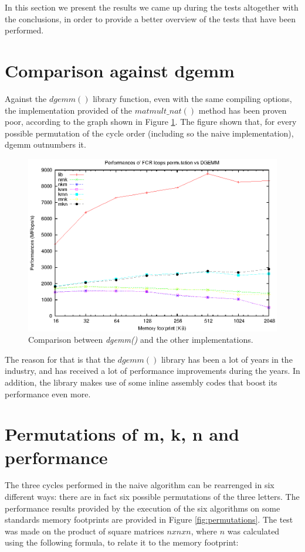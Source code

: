 In this section we present the results we came up during the tests altogether with the conclusions, in order to provide a better overview of the tests that have been performed. 

\section{Comparison against dgemm}

Against the $dgemm()$ library function, even with the same compiling options, the implementation provided of the $matmult\_nat()$ method has been proven poor, according to the graph shown in Figure \ref{fig:natdgemmcomp}. The figure shown that, for every possible permutation of the cycle order (including so the naive implementation), dgemm outnumbers it.

\begin{figure}[here]
\centering
\includegraphics[width=\textwidth]{results/dgemm.eps}
\caption{Comparison between \emph{dgemm()} and the other implementations.}
\label{fig:natdgemmcomp}
\end{figure}

The reason for that is that the $dgemm()$ library has been a lot of years in the industry, and has received a lot of performance improvements during the years. In addition, the library makes use of some inline assembly codes that boost its performance even more.

\section{Permutations of m, k, n and performance}
The three cycles performed in the naive algorithm can be rearrenged in six different ways: there are in fact six possible permutations of the three letters. The performance results provided by the execution of the six algorithms on some standards memory footprints are provided in Figure \ref{fig:permutations}. The test was made on the product of square matrices $nxnxn$, where $n$ was calculated using the following formula, to relate it to the memory footprint:

